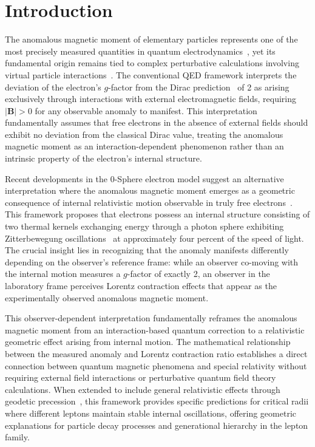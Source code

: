 \documentclass[%
 reprint,
 amsmath,amssymb,
 aps,
]{revtex4-1}
\numberwithin{equation}{section}%
\begin{document}
\section{Introduction}

The anomalous magnetic moment of elementary particles represents one of the most precisely measured quantities in quantum electrodynamics~\cite{fan2023,hanneke2008,gabrielse2006}, yet its fundamental origin remains tied to complex perturbative calculations involving virtual particle interactions~\cite{schwinger1948,feynman1948,feynman1949,tomonaga1946,aoyama2015}. The conventional QED framework interprets the deviation of the electron's $g$-factor from the Dirac prediction~\cite{dirac1928} of 2 as arising exclusively through interactions with external electromagnetic fields, requiring $|\mathbf{B}| > 0$ for any observable anomaly to manifest. This interpretation fundamentally assumes that free electrons in the absence of external fields should exhibit no deviation from the classical Dirac value, treating the anomalous magnetic moment as an interaction-dependent phenomenon rather than an intrinsic property of the electron's internal structure.

Recent developments in the 0-Sphere electron model suggest an alternative interpretation where the anomalous magnetic moment emerges as a geometric consequence of internal relativistic motion observable in truly free electrons~\cite{hanamura2018}. This framework proposes that electrons possess an internal structure consisting of two thermal kernels exchanging energy through a photon sphere exhibiting Zitterbewegung oscillations~\cite{schrodinger1930} at approximately four percent of the speed of light. The crucial insight lies in recognizing that the anomaly manifests differently depending on the observer's reference frame: while an observer co-moving with the internal motion measures a $g$-factor of exactly 2, an observer in the laboratory frame perceives Lorentz contraction effects that appear as the experimentally observed anomalous magnetic moment.

This observer-dependent interpretation fundamentally reframes the anomalous magnetic moment from an interaction-based quantum correction to a relativistic geometric effect arising from internal motion. The mathematical relationship between the measured anomaly and Lorentz contraction ratio establishes a direct connection between quantum magnetic phenomena and special relativity without requiring external field interactions or perturbative quantum field theory calculations. When extended to include general relativistic effects through geodetic precession~\cite{thomas1926,thomas1927}, this framework provides specific predictions for critical radii where different leptons maintain stable internal oscillations, offering geometric explanations for particle decay processes and generational hierarchy in the lepton family.
\end{document}
